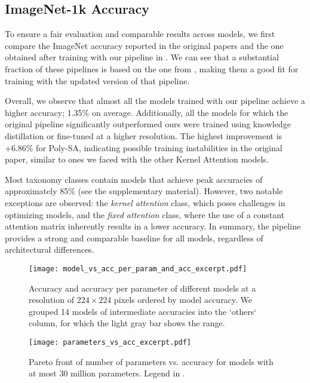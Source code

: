 \subsection{ImageNet-1k Accuracy}
To ensure a fair evaluation and comparable results across models, we first compare the ImageNet accuracy reported in the original papers and the one obtained after training with our pipeline in .
We can see that a substantial fraction of these pipelines is based on the one from \cite{Touvron2021b}, making them a good fit for training with the updated version of that pipeline.


Overall, we observe that almost all the models trained with our pipeline achieve a higher accuracy; 1.35\% on average.
Additionally, all the models for which the original pipeline significantly outperformed ours were trained using knowledge distillation or fine-tuned at a higher resolution. 
The highest improvement is +6.86\% for 
Poly-SA, indicating possible training instabilities in the original paper, similar to ones we faced with the other Kernel Attention models.

Most taxonomy classes contain models that achieve peak accuracies of approximately 85\% (see the supplementary material). However, two notable exceptions are observed: the \emph{kernel attention} class, which poses challenges in optimizing models, and the \emph{fixed attention} class, where the use of a constant attention matrix inherently results in a lower accuracy.
In summary, the pipeline provides a strong and comparable baseline for all models, regardless of architectural differences.

\begin{figure}
	\centering
	\texttt{[image: model\_vs\_acc\_per\_param\_and\_acc\_excerpt.pdf]}
	\caption{Accuracy and accuracy per parameter of different models at a resolution of $224 \times 224$ pixels ordered by model accuracy. We grouped 14 models of intermediate accuracies into the `others` column, for which the light gray bar  shows the range.}
	\label{fig:model_vs_acc_per_param_and_acc_excerpt}
\end{figure}
\begin{figure}[h]
	\centering
	\texttt{[image: parameters\_vs\_acc\_excerpt.pdf]}
	\caption{Pareto front of number of parameters vs. accuracy for models with at most 30 million parameters. Legend in .}
	\label{fig:parameters_vs_acc_excerpt}
\end{figure}


